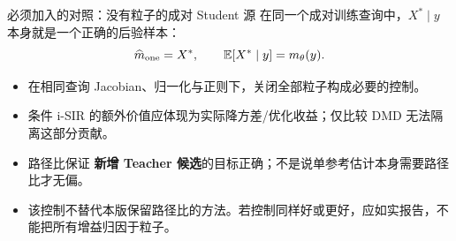 \documentclass[10pt,aspectratio=169]{beamer}
\newcommand{\E}{\mathbb E}
\begin{document}
\begin{frame}{必须加入的对照：没有粒子的成对 Student 源}
\small
在同一个成对训练查询中，$X^*\mid y$ 本身就是一个正确的后验样本：
\begin{equation}
\widehat m_{\rm one}=X^*,\qquad \E[X^*\mid y]=m_\theta(y).
\end{equation}
\begin{itemize}\itemsep6pt
\item 在相同查询 Jacobian、归一化与正则下，关闭全部粒子构成必要的控制。
\item 条件 i-SIR 的额外价值应体现为实际降方差/优化收益；仅比较 DMD 无法隔离这部分贡献。
\item 路径比保证 \textbf{新增 Teacher 候选}的目标正确；不是说单参考估计本身需要路径比才无偏。
\item 该控制不替代本版保留路径比的方法。若控制同样好或更好，应如实报告，不能把所有增益归因于粒子。
\end{itemize}
\end{frame}
\end{document}

